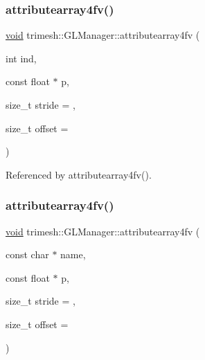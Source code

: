 \subsubsection{\texorpdfstring{attributearray4fv()}{attributearray4fv()}\hspace{0.1cm}{\footnotesize\ttfamily [1/6]}}
{\footnotesize\ttfamily \hyperlink{namespacetrimesh_a784ddfd979e1c579bda795a8edfc3f43}{void} trimesh\+::\+G\+L\+Manager\+::attributearray4fv (\begin{DoxyParamCaption}\item[{int}]{ind,  }\item[{const float $\ast$}]{p,  }\item[{size\+\_\+t}]{stride = {},  }\item[{size\+\_\+t}]{offset = {} }\end{DoxyParamCaption})\hspace{0.3cm}{\ttfamily [inline]}}



Referenced by attributearray4fv().

\mbox{\label{classtrimesh_1_1GLManager_ada8d618ad41ccbc60c45764826639ba3}} 
\subsubsection{\texorpdfstring{attributearray4fv()}{attributearray4fv()}\hspace{0.1cm}{\footnotesize\ttfamily [2/6]}}
{\footnotesize\ttfamily \hyperlink{namespacetrimesh_a784ddfd979e1c579bda795a8edfc3f43}{void} trimesh\+::\+G\+L\+Manager\+::attributearray4fv (\begin{DoxyParamCaption}\item[{const char $\ast$}]{name,  }\item[{const float $\ast$}]{p,  }\item[{size\+\_\+t}]{stride = {},  }\item[{size\+\_\+t}]{offset = {} }\end{DoxyParamCaption})\hspace{0.3cm}{\ttfamily [inline]}}

\mbox{\label{classtrimesh_1_1GLManager_ad3ef1d86a4d22faa3904c9bec3fce572}} 
